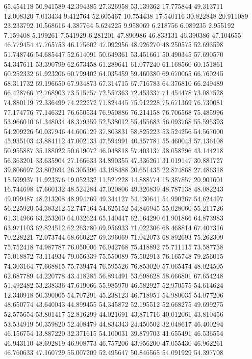 65.454118
50.941589
42.394385
27.326958
53.139362
17.775844
49.313711
12.008320
7.013434
9.412764
52.605467
10.754438
17.540116
30.822848
20.911089
23.233792
10.568616
4.387764
5.624225
9.958069
6.218756
6.089235
2.955192
7.159408
5.199261
7.541929
6.281201
47.890986
46.833131
46.390386
47.104655
46.779454
47.765753
46.175602
47.092956
48.926270
48.250575
52.693598
51.748746
54.685447
52.614091
50.649361
53.451661
50.490345
57.690570
54.347611
53.390799
62.673458
61.289641
61.077240
61.168560
60.151861
60.252332
61.923206
60.799402
64.035459
59.460380
69.670065
66.760245
68.311732
69.196650
67.934873
67.314715
67.716783
64.376810
66.249489
66.428766
72.768903
73.515757
72.557363
72.453337
71.454478
73.087528
74.880119
72.336499
74.222272
71.824445
75.912228
75.671369
76.730081
77.174776
77.146321
76.650534
76.950886
76.214158
76.706568
75.485996
53.966010
61.348034
48.379359
52.538012
55.455683
56.093768
55.595393
54.209226
50.037946
44.606129
37.803831
58.825223
53.524256
54.567000
45.935103
43.884112
47.002133
47.594991
40.357781
55.460043
57.136108
50.955887
35.188022
50.619072
46.048818
57.403137
38.058296
43.144218
56.363201
33.635904
27.166633
34.890355
47.336261
31.019147
30.881727
39.806697
23.802694
26.305396
43.198488
20.651435
22.874868
27.486318
15.599937
11.923376
19.052332
11.527228
14.888774
15.387857
20.901601
16.744698
47.660132
48.524284
47.020806
49.326839
48.787138
48.082243
49.099487
48.213208
48.994769
49.344127
54.130641
54.990267
54.624497
56.225920
54.383212
52.747164
54.625152
54.846945
55.028060
55.211726
61.314966
63.253260
64.032624
65.140447
62.164290
61.901866
64.873983
63.971103
62.824512
62.263780
69.956933
71.022306
68.468814
67.407316
70.228221
72.073744
68.660227
69.396069
71.042073
68.892693
75.262309
75.752418
74.987787
76.050006
76.942768
75.418892
75.711115
73.587738
75.018872
73.114934
79.056339
75.550089
75.502913
76.165748
79.256015
74.303164
77.668815
75.739474
76.595526
76.853020
57.065474
48.024505
62.687789
44.220778
43.418285
56.894491
53.698628
58.666801
67.654248
51.492482
53.238336
47.619066
55.985970
46.582927
52.970575
54.614624
12.340918
50.390005
54.707291
45.238123
46.718951
54.980035
54.077206
48.650774
43.640043
44.899455
54.345872
52.195512
52.668275
49.699275
52.575654
53.801417
52.816299
44.021691
43.871716
40.012061
43.810456
53.534919
50.359820
52.408479
44.834343
24.450502
32.048617
46.400294
46.156754
13.887220
32.371615
54.100031
39.879703
41.655491
46.536554
46.943110
48.692819
46.908773
46.757206
43.956200
47.055430
46.962261
46.760633
47.160729
55.007209
52.495647
50.846565
54.091929
54.397708
